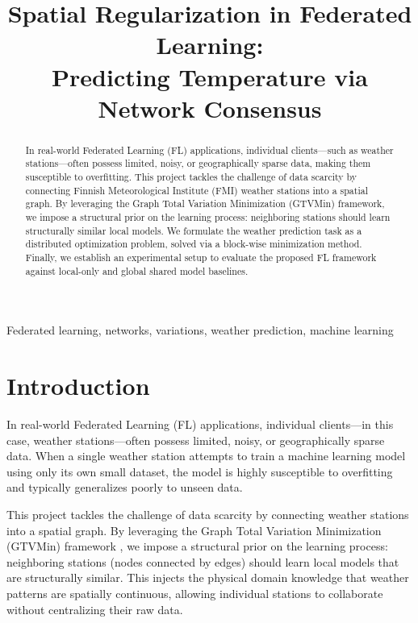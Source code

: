 \documentclass{article}
\title{Spatial Regularization in Federated Learning: \\ Predicting Temperature via Network Consensus}
\begin{document}
\maketitle

\begin{abstract}
In real-world Federated Learning (FL) applications, individual clients---such as weather stations---often possess limited, noisy, or geographically sparse data, making them susceptible to overfitting. This project tackles the challenge of data scarcity by connecting Finnish Meteorological Institute (FMI) weather stations into a spatial graph. By leveraging the Graph Total Variation Minimization (GTVMin) framework, we impose a structural prior on the learning process: neighboring stations should learn structurally similar local models. We formulate the weather prediction task as a distributed optimization problem, solved via a block-wise minimization method. Finally, we establish an experimental setup to evaluate the proposed FL framework against local-only and global shared model baselines.
\end{abstract}

\begin{keywords}
Federated learning, networks, variations, weather prediction, machine learning
\end{keywords}


\section{Introduction}
\label{sec:intro}

In real-world Federated Learning (FL) \cite{AaltoDictML} applications, individual clients---in this case, weather stations---often possess limited, noisy, or geographically sparse data. When a single weather station attempts to train a machine learning model using only its own small dataset, the model is highly susceptible to overfitting and typically generalizes poorly to unseen data.

This project tackles the challenge of data scarcity by connecting weather stations into a spatial graph. By leveraging the Graph Total Variation Minimization (GTVMin) framework \cite{Jung2025}, we impose a structural prior on the learning process: neighboring stations (nodes connected by edges) should learn local models that are structurally similar. This injects the physical domain knowledge that weather patterns are spatially continuous, allowing individual stations to collaborate without centralizing their raw data. 
\end{document}
